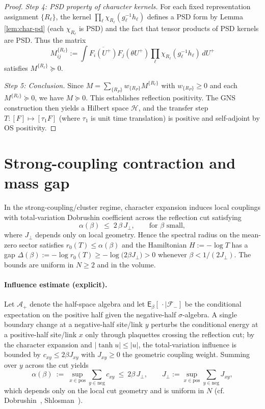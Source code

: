 \documentclass[11pt]{amsart}
\begin{document}
\begin{proof}
\emph{Step 4: PSD property of character kernels.} For each fixed representation assignment $\{R_\ell\}$, the kernel $\prod_\ell \chi_{R_\ell}(g_\ell^{-1} h_\ell)$ defines a PSD form by Lemma \ref{lem:char-pd} (each $\chi_{R_\ell}$ is PSD) and the fact that tensor products of PSD kernels are PSD. Thus the matrix
\[
  M_{ij}^{\{R_\ell\}} := \int \overline{F_i(U^+)} F_j(\theta U^+) \prod_{\ell} \chi_{R_\ell}(g_\ell^{-1} h_\ell) \, dU^+
\]
satisfies $M^{\{R_\ell\}} \succeq 0$.

\emph{Step 5: Conclusion.} Since $M = \sum_{\{R_P\}} w_{\{R_P\}} M^{\{R_\ell\}}$ with $w_{\{R_P\}} \ge 0$ and each $M^{\{R_\ell\}} \succeq 0$, we have $M \succeq 0$. This establishes reflection positivity. The GNS construction then yields a Hilbert space $\mathcal H$, and the transfer step $T: [F] \mapsto [\tau_1 F]$ (where $\tau_1$ is unit time translation) is positive and self-adjoint by OS positivity.
\end{proof}

\section{Strong-coupling contraction and mass gap}

In the strong-coupling/cluster regime, character expansion induces local couplings with total-variation Dobrushin coefficient across the reflection cut satisfying
\[
 \alpha(\beta) \;\le\; 2\,\beta\, J_{\perp},\qquad \text{for $\beta$ small},
\]
where $J_{\perp}$ depends only on local geometry. Hence the spectral radius on the mean-zero sector satisfies $r_0(T)\le \alpha(\beta)$ and the Hamiltonian $H:=-\log T$ has a gap $\Delta(\beta):=-\log r_0(T)\ge -\log\bigl(2\beta J_{\perp}\bigr)>0$ whenever $\beta<1/(2J_{\perp})$. The bounds are uniform in $N\ge 2$ and in the volume.

\paragraph{Influence estimate (explicit).}
Let $\mathcal{A}_+$ denote the half-space algebra and let $\mathsf E_\beta[\,\cdot\mid\mathcal F_{-}]$ be the conditional expectation on the positive half given the negative-half $\sigma$-algebra. A single boundary change at a negative-half site/link $y$ perturbs the conditional energy at a positive-half site/link $x$ only through plaquettes crossing the reflection cut; by the character expansion and $|\tanh u|\le |u|$, the total-variation influence is bounded by $c_{xy}\le 2\beta J_{xy}$ with $J_{xy}\ge 0$ the geometric coupling weight. Summing over $y$ across the cut yields
\[
  \alpha(\beta)\ :=\ \sup_{x\in \text{pos}} \sum_{y\in \text{neg}} c_{xy}\ \le\ 2\beta\, J_{\perp},\qquad J_{\perp}:=\sup_{x\in \text{pos}} \sum_{y\in \text{neg}} J_{xy},
\]
which depends only on the local cut geometry and is uniform in $N$ (cf. Dobrushin~\cite{Dobrushin1970}, Shlosman~\cite{Shlosman1986}).
\end{document}
